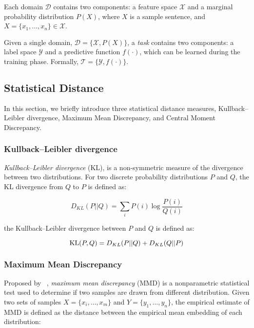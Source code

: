 Each domain $\mathcal{D}$ contains two components: a feature space $\mathcal{X}$ and a marginal probability distribution $P(X)$, where $X$ is a sample sentence,
and $X = \{x_1, \ldots, x_n\} \in \mathcal{X}$. 


Given a single domain, $\mathcal{D} = \{\mathcal{X}, P(X)\}$, a \textit{task} contains two components: a label space $\mathcal{Y}$ and a predictive function $f(\cdot)$, which can be learned during the training phase. Formally, $\mathcal{T} = \{\mathcal{Y}, f(\cdot)\}$.

\subsection{Statistical Distance}

In this section, we briefly introduce three statistical distance measures, Kullback–Leibler divergence, Maximum Mean Discrepancy, and Central Moment Discrepancy.

\subsubsection{Kullback–Leibler divergence}
{\em Kullback–Leibler divergence} (KL), is a non-symmetric measure of the divergence between two distributions. For two discrete probability distributions $P$ and $Q$, the KL divergence from $Q$ to $P$ is defined as:

\small
\begin{equation}
D_{KL}(P||Q) = \sum_i{P(i)\log{\frac{P(i)}{Q(i)}}}
\end{equation}
\normalsize

the Kullback–Leibler divergence between $P$ and $Q$ is defined as:

{\small
\begin{equation}
\textnormal{KL}(P, Q) = D_{KL}(P||Q) + D_{KL}(Q||P)
\end{equation}
}

\subsubsection{Maximum Mean Discrepancy}
Proposed by ~\citet{Gretton:2012:KTT:2188385.2188410}, 
{\em maximum mean discrepancy} (MMD) is a nonparametric statistical 
test used to determine if two samples are drawn from different distribution.  
Given two sets of samples $X = \{x_i, \ldots, x_m\}$ and 
$Y = \{y_1, \ldots, y_n\}$, the empirical estimate of MMD is defined as 
the distance between the empirical mean embedding of each distribution:

